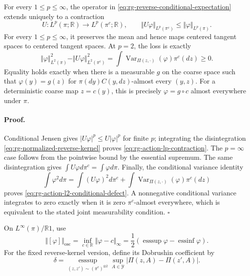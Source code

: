 For every \(1\leq p\leq\infty\), the operator in
\eqref{eq:rg-reverse-conditional-expectation} extends uniquely to a
contraction
\begin{equation}
U:L^p(\pi;\mathbb R)\longrightarrow L^p(\pi^c;\mathbb R),
\qquad
\Vert U\varphi\Vert_{L^p(\pi^c)}
\leq\Vert\varphi\Vert_{L^p(\pi)}.
\label{eq:rg-action-lp-contraction}
\end{equation}
For every \(1\leq p\leq\infty\), it preserves the mean and hence maps centered tangent
spaces to centered tangent spaces.  At \(p=2\), the loss is exactly
\begin{equation}
\Vert\varphi\Vert_{L^2(\pi)}^2
-\Vert U\varphi\Vert_{L^2(\pi^c)}^2
=\int\operatorname{Var}_{\Pi(z,\cdot)}(\varphi)\pi^c(dz)
\geq0.
\label{eq:rg-action-l2-conditional-defect}
\end{equation}
Equality holds exactly when there is a measurable \(g\) on the coarse space
such that \(\varphi(y)=g(z)\) for
\(\pi(dy)C(y,dz)\)-almost every \((y,z)\).  For a deterministic coarse map
\(z=c(y)\), this is precisely \(\varphi=g\circ c\) almost everywhere
under \(\pi\). 

\paragraph{Proof.}
Conditional Jensen gives
\(\lvert U\varphi\rvert^p\leq U\lvert\varphi\rvert^p\) for finite
\(p\); integrating the disintegration
\eqref{eq:rg-normalized-reverse-kernel} proves
\eqref{eq:rg-action-lp-contraction}.  The \(p=\infty\) case follows from
the pointwise bound by the essential supremum.  The same disintegration gives
\(\int U\varphi d\pi^c=\int\varphi d\pi\).  Finally, the conditional
variance identity
\begin{equation}
\int\varphi^2d\pi
=\int(U\varphi)^2d\pi^c
+\int\operatorname{Var}_{\Pi(z,\cdot)}(\varphi)\pi^c(dz)
\label{eq:rg-action-total-conditional-variance}
\end{equation}
proves \eqref{eq:rg-action-l2-conditional-defect}.  A nonnegative
conditional variance integrates to zero exactly when it is zero
\(\pi^c\)-almost everywhere, which is equivalent to the stated joint
measurability condition.  \(\square\)

On \(L^\infty(\pi)/\mathbb R1\), use
\begin{equation}
\Vert[\varphi]\Vert_{\mathrm{osc}}
=\inf_{c\in\mathbb R}\Vert\varphi-c\Vert_\infty
=\frac12\left(
\operatorname*{ess sup}\varphi-
\operatorname*{ess inf}\varphi\right).
\label{eq:rg-action-oscillation-norm}
\end{equation}
For the fixed reverse-kernel version, define its Dobrushin coefficient by
\begin{equation}
\delta=
\operatorname*{ess sup}_{(z,z')\sim(\pi^c)^{\otimes2}}
\sup_{A\in\mathscr Y}
\left|\Pi(z,A)-\Pi(z',A)\right|.
\label{eq:rg-action-dobrushin-coefficient}
\end{equation}

